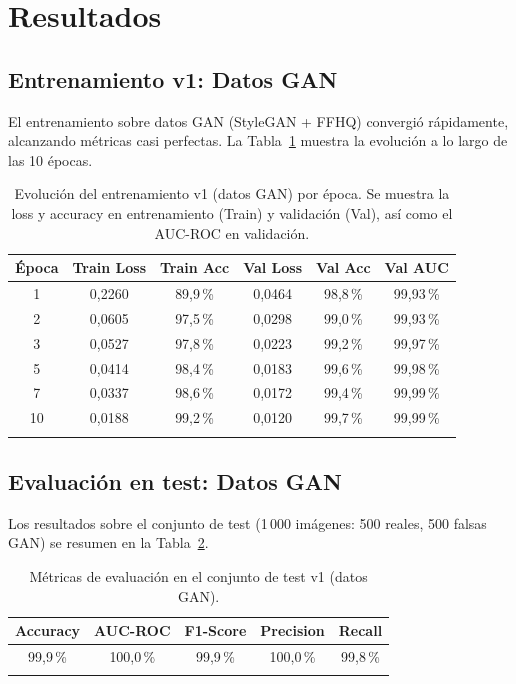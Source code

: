 \documentclass[pdflatex,sn-mathphys-num]{sn-jnl}
\begin{document}
\section{Resultados}\label{sec:results}

\subsection{Entrenamiento v1: Datos GAN}\label{subsec:results_v1}

El entrenamiento sobre datos GAN (StyleGAN + FFHQ) convergió rápidamente, alcanzando métricas casi perfectas. La Tabla~\ref{tab:training_v1} muestra la evolución a lo largo de las 10 épocas.

\begin{table}[h]
\caption{Evolución del entrenamiento v1 (datos GAN) por época. Se muestra la loss y accuracy en entrenamiento (Train) y validación (Val), así como el AUC-ROC en validación.}\label{tab:training_v1}
\begin{tabular*}{\textwidth}{@{\extracolsep\fill}cccccc}
\toprule
Época & Train Loss & Train Acc & Val Loss & Val Acc & Val AUC \\
\midrule
1  & 0,2260 & 89,9\,\% & 0,0464 & 98,8\,\% & 99,93\,\% \\
2  & 0,0605 & 97,5\,\% & 0,0298 & 99,0\,\% & 99,93\,\% \\
3  & 0,0527 & 97,8\,\% & 0,0223 & 99,2\,\% & 99,97\,\% \\
5  & 0,0414 & 98,4\,\% & 0,0183 & 99,6\,\% & 99,98\,\% \\
7  & 0,0337 & 98,6\,\% & 0,0172 & 99,4\,\% & 99,99\,\% \\
10 & 0,0188 & 99,2\,\% & 0,0120 & 99,7\,\% & 99,99\,\% \\
\botrule
\end{tabular*}
\end{table}

\subsection{Evaluación en test: Datos GAN}\label{subsec:results_test}

Los resultados sobre el conjunto de test (1\,000 imágenes: 500 reales, 500 falsas GAN) se resumen en la Tabla~\ref{tab:test_v1}.

\begin{table}[h]
\caption{Métricas de evaluación en el conjunto de test v1 (datos GAN).}\label{tab:test_v1}
\begin{tabular*}{\textwidth}{@{\extracolsep\fill}ccccc}
\toprule
Accuracy & AUC-ROC & F1-Score & Precision & Recall \\
\midrule
99,9\,\% & 100,0\,\% & 99,9\,\% & 100,0\,\% & 99,8\,\% \\
\botrule
\end{tabular*}
\end{table}
\end{document}
